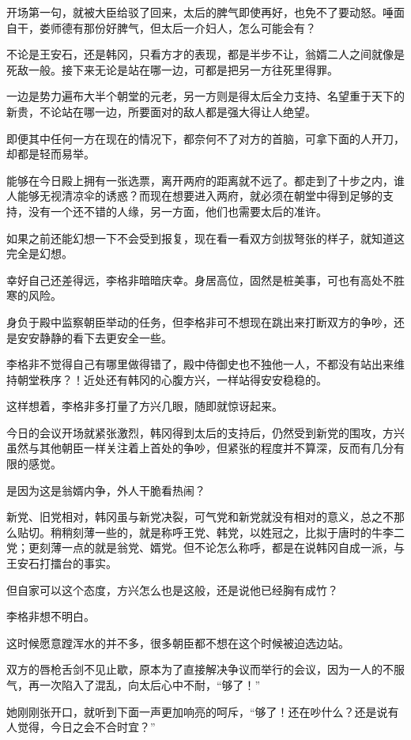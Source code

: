 开场第一句，就被大臣给驳了回来，太后的脾气即使再好，也免不了要动怒。唾面自干，娄师德有那份好脾气，但太后一介妇人，怎么可能会有？

不论是王安石，还是韩冈，只看方才的表现，都是半步不让，翁婿二人之间就像是死敌一般。接下来无论是站在哪一边，可都是把另一方往死里得罪。

一边是势力遍布大半个朝堂的元老，另一方则是得太后全力支持、名望重于天下的新贵，不论站在哪一边，所要面对的敌人都是强大得让人绝望。

即便其中任何一方在现在的情况下，都奈何不了对方的首脑，可拿下面的人开刀，却都是轻而易举。

能够在今日殿上拥有一张选票，离开两府的距离就不远了。都走到了十步之内，谁人能够无视清凉伞的诱惑？而现在想要进入两府，就必须在朝堂中得到足够的支持，没有一个还不错的人缘，另一方面，他们也需要太后的准许。

如果之前还能幻想一下不会受到报复，现在看一看双方剑拔弩张的样子，就知道这完全是幻想。

幸好自己还差得远，李格非暗暗庆幸。身居高位，固然是桩美事，可也有高处不胜寒的风险。

身负于殿中监察朝臣举动的任务，但李格非可不想现在跳出来打断双方的争吵，还是安安静静的看下去更安全一些。

李格非不觉得自己有哪里做得错了，殿中侍御史也不独他一人，不都没有站出来维持朝堂秩序？！近处还有韩冈的心腹方兴，一样站得安安稳稳的。

这样想着，李格非多打量了方兴几眼，随即就惊讶起来。

今日的会议开场就紧张激烈，韩冈得到太后的支持后，仍然受到新党的围攻，方兴虽然与其他朝臣一样关注着上首处的争吵，但紧张的程度并不算深，反而有几分有限的感觉。

是因为这是翁婿内争，外人干脆看热闹？

新党、旧党相对，韩冈虽与新党决裂，可气党和新党就没有相对的意义，总之不那么贴切。稍稍刻薄一些的，就是称呼王党、韩党，以姓冠之，比拟于唐时的牛李二党；更刻薄一点的就是翁党、婿党。但不论怎么称呼，都是在说韩冈自成一派，与王安石打擂台的事实。

但自家可以这个态度，方兴怎么也是这般，还是说他已经胸有成竹？

李格非想不明白。

这时候愿意蹚浑水的并不多，很多朝臣都不想在这个时候被迫选边站。

双方的唇枪舌剑不见止歇，原本为了直接解决争议而举行的会议，因为一人的不服气，再一次陷入了混乱，向太后心中不耐，“够了！”

她刚刚张开口，就听到下面一声更加响亮的呵斥，“够了！还在吵什么？还是说有人觉得，今日之会不合时宜？”

